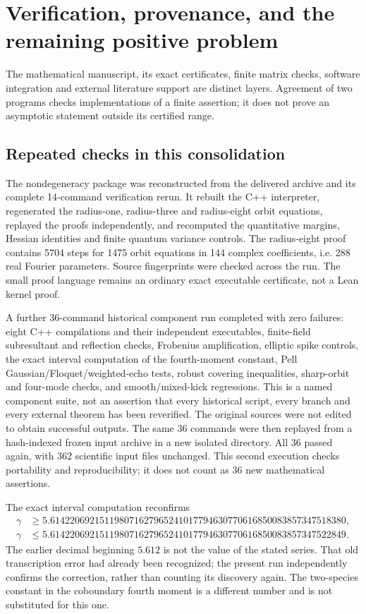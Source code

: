 \section{Verification, provenance, and the remaining positive problem}
\label{sec:verification}
The mathematical manuscript, its exact certificates, finite matrix checks,
software integration and external literature support are distinct layers.
Agreement of two programs checks implementations of a finite assertion; it
does not prove an asymptotic statement outside its certified range.

\subsection{Repeated checks in this consolidation}
The nondegeneracy package was reconstructed from the delivered archive and
its complete 14-command verification rerun. It rebuilt the C++ interpreter,
regenerated the radius-one, radius-three and radius-eight orbit equations,
replayed the proofs independently, and recomputed the quantitative margins,
Hessian identities and finite quantum variance controls. The radius-eight
proof contains 5704 steps for 1475 orbit equations in 144 complex coefficients,
i.e. 288 real Fourier parameters. Source fingerprints were checked across
the run. The small proof language remains an ordinary exact executable
certificate, not a Lean kernel proof.

A further 36-command historical component run completed with zero failures:
eight C++ compilations and their independent executables, finite-field
subresultant and reflection checks, Frobenius amplification, elliptic
spike controls, the exact interval computation of the fourth-moment constant,
Pell Gaussian/Floquet/weighted-echo tests, robust covering inequalities,
sharp-orbit and four-mode checks, and smooth/mixed-kick regressions.
This is a named component suite, not an assertion that every historical
script, every branch and every external theorem has been reverified.
The original sources were not edited to obtain successful outputs. The same
36 commands were then replayed from a hash-indexed frozen input archive in
a new isolated directory. All 36 passed again, with 362 scientific input
files unchanged. This second execution checks portability and reproducibility;
it does not count as 36 new mathematical assertions.

The exact interval computation reconfirms
\[
 \begin{aligned}
 \gamma&\geq5.614220692151198071627965241017794630770616850083857347518380,\\
 \gamma&\leq5.614220692151198071627965241017794630770616850083857347522849.
 \end{aligned}
\]
The earlier decimal beginning $5.612$ is not the value of the stated series.
That old transcription error had already been recognized; the present run
independently confirms the correction, rather than counting its discovery
again. The two-species constant in the coboundary fourth moment is a different
number and is not substituted for this one.

